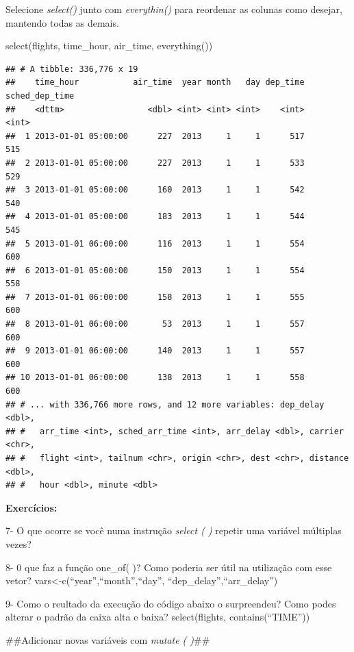 \documentclass[
]{article}
\newenvironment{Shaded}{\begin{snugshade}}{\end{snugshade}}
\newcommand{\FunctionTok}[1]{\textcolor[rgb]{0.00,0.00,0.00}{#1}}
\newcommand{\NormalTok}[1]{#1}
\begin{document}
Selecione \emph{select()} junto com \emph{everythin()} para reordenar as
colunas como desejar, mantendo todas as demais.

\begin{Shaded}
\begin{Highlighting}[]
\FunctionTok{select}\NormalTok{(flights, time\_hour, air\_time, }\FunctionTok{everything}\NormalTok{())}
\end{Highlighting}
\end{Shaded}

\begin{verbatim}
## # A tibble: 336,776 x 19
##    time_hour           air_time  year month   day dep_time sched_dep_time
##    <dttm>                 <dbl> <int> <int> <int>    <int>          <int>
##  1 2013-01-01 05:00:00      227  2013     1     1      517            515
##  2 2013-01-01 05:00:00      227  2013     1     1      533            529
##  3 2013-01-01 05:00:00      160  2013     1     1      542            540
##  4 2013-01-01 05:00:00      183  2013     1     1      544            545
##  5 2013-01-01 06:00:00      116  2013     1     1      554            600
##  6 2013-01-01 05:00:00      150  2013     1     1      554            558
##  7 2013-01-01 06:00:00      158  2013     1     1      555            600
##  8 2013-01-01 06:00:00       53  2013     1     1      557            600
##  9 2013-01-01 06:00:00      140  2013     1     1      557            600
## 10 2013-01-01 06:00:00      138  2013     1     1      558            600
## # ... with 336,766 more rows, and 12 more variables: dep_delay <dbl>,
## #   arr_time <int>, sched_arr_time <int>, arr_delay <dbl>, carrier <chr>,
## #   flight <int>, tailnum <chr>, origin <chr>, dest <chr>, distance <dbl>,
## #   hour <dbl>, minute <dbl>
\end{verbatim}

\textbf{Exercícios:}

7- O que ocorre se você numa instrução \emph{select ( )} repetir uma
variável múltiplas vezes?

8- 0 que faz a função one\_of( )? Como poderia ser útil na utilização
com esse vetor? vars\textless-c(``year'',``month'',``day'',
``dep\_delay'',``arr\_delay'')

9- Como o reultado da execução do código abaixo o surpreendeu? Como
podes alterar o padrão da caixa alta e baixa? select(flights,
contains(``TIME''))

\#\#Adicionar novas variáveis com \emph{mutate ( )}\#\#
\end{document}
